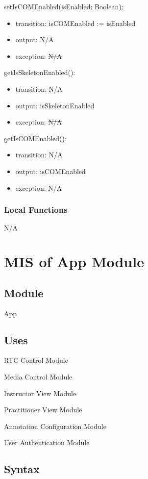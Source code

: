 \documentclass[12pt, titlepage]{article}
\newcommand{\rt}[1]{\textcolor{red}{#1}}
\begin{document}
\noindent setIsCOMEnabled(isEnabled: Boolean):
\begin{itemize}
\item transition: isCOMEnabled := isEnabled
\item output: N/A
\item exception: \sout{N/A} \rt{}
\end{itemize}

\noindent getIsSkeletonEnabled():
\begin{itemize}
\item transition: N/A
\item output: isSkeletonEnabled
\item exception: \sout{N/A} \rt{}
\end{itemize}

\noindent getIsCOMEnabled():
\begin{itemize}
\item transition: N/A
\item output: isCOMEnabled
\item exception: \sout{N/A} \rt{}
\end{itemize}


\subsubsection{Local Functions}

N/A


\section{MIS of App Module} \label{sec:appmodule}

\subsection{Module}
App

\subsection{Uses}
RTC Control Module

Media Control Module

Instructor View Module

Practitioner View Module

Annotation Configuration Module

User Authentication Module

\subsection{Syntax}
\end{document}
